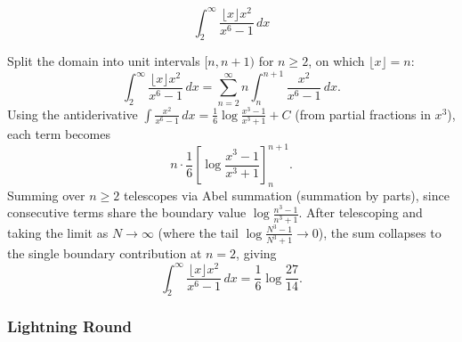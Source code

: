 \begin{questions}
\question
\[
\int_2^\infty \frac{\lfloor x\rfloor x^2}{x^6-1}\,dx
\]
\begin{solution}
Split the domain into unit intervals $[n,n+1)$ for $n\ge2$, on which $\lfloor x\rfloor=n$:
\[
\int_2^\infty \frac{\lfloor x\rfloor x^2}{x^6-1}\,dx=\sum_{n=2}^\infty n\int_n^{n+1}\frac{x^2}{x^6-1}\,dx.
\]
Using the antiderivative $\displaystyle\int \frac{x^2}{x^6-1}\,dx=\frac16\log\frac{x^3-1}{x^3+1}+C$ (from partial fractions in $x^3$), each term becomes
\[
n\cdot\frac16\left[\log\frac{x^3-1}{x^3+1}\right]_n^{n+1}.
\]
Summing over $n\ge2$ telescopes via Abel summation (summation by parts), since consecutive terms share the boundary value $\log\frac{n^3-1}{n^3+1}$. After telescoping and taking the limit as $N\to\infty$ (where the tail $\log\frac{N^3-1}{N^3+1}\to0$), the sum collapses to the single boundary contribution at $n=2$, giving
\[
\int_2^\infty \frac{\lfloor x\rfloor x^2}{x^6-1}\,dx=\frac16\log\frac{27}{14}.
\]
\end{solution}
 
\end{questions}
 
\subsubsection*{Lightning Round}
 
